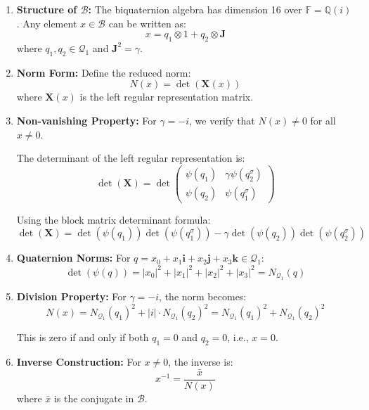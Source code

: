 \begin{enumerate}
    \item \textbf{Structure of $\mathcal{B}$:} The biquaternion algebra has dimension 16 over $\mathbb{F} = \mathbb{Q}(i)$. Any element $x \in \mathcal{B}$ can be written as:
    \begin{equation}
    x = q_1 \otimes 1 + q_2 \otimes \mathbf{J}
    \end{equation}
    where $q_1, q_2 \in \mathcal{Q}_1$ and $\mathbf{J}^2 = \gamma$.
    
    \item \textbf{Norm Form:} Define the reduced norm:
    \begin{equation}
    N(x) = \det(\mathbf{X}(x))
    \end{equation}
    where $\mathbf{X}(x)$ is the left regular representation matrix.
    
    \item \textbf{Non-vanishing Property:} For $\gamma = -i$, we verify that $N(x) \neq 0$ for all $x \neq 0$.
    
    The determinant of the left regular representation is:
    \begin{equation}
    \det(\mathbf{X}) = \det\begin{pmatrix}
    \psi(q_1) & \gamma \psi(q_2^{\sigma}) \\
    \psi(q_2) & \psi(q_1^{\sigma})
    \end{pmatrix}
    \end{equation}
    
    Using the block matrix determinant formula:
    \begin{equation}
    \det(\mathbf{X}) = \det(\psi(q_1))\det(\psi(q_1^{\sigma})) - \gamma \det(\psi(q_2))\det(\psi(q_2^{\sigma}))
    \end{equation}
    
    \item \textbf{Quaternion Norms:} For $q = x_0 + x_1\mathbf{i} + x_2\mathbf{j} + x_3\mathbf{k} \in \mathcal{Q}_1$:
    \begin{equation}
    \det(\psi(q)) = |x_0|^2 + |x_1|^2 + |x_2|^2 + |x_3|^2 = N_{\mathcal{Q}_1}(q)
    \end{equation}
    
    \item \textbf{Division Property:} For $\gamma = -i$, the norm becomes:
    \begin{equation}
    N(x) = N_{\mathcal{Q}_1}(q_1)^2 + |i| \cdot N_{\mathcal{Q}_1}(q_2)^2 = N_{\mathcal{Q}_1}(q_1)^2 + N_{\mathcal{Q}_1}(q_2)^2
    \end{equation}
    
    This is zero if and only if both $q_1 = 0$ and $q_2 = 0$, i.e., $x = 0$.
    
    \item \textbf{Inverse Construction:} For $x \neq 0$, the inverse is:
    \begin{equation}
    x^{-1} = \frac{\bar{x}}{N(x)}
    \end{equation}
    where $\bar{x}$ is the conjugate in $\mathcal{B}$.
\end{enumerate}

